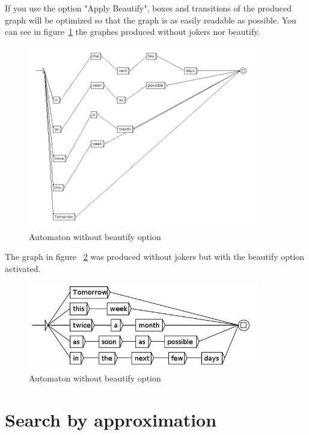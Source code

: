 If you use the option "Apply Beautify", boxes and transitions of the produced graph will be optimized so that the graph is as easily readable as possible. You can see in figure~\ref{fig8-5GRFnoBeautify} the graphes produced without jokers nor beautify.
\begin{figure}[h!]
	\begin{center}
		\includegraphics[width=10cm]{resources/img/fig8-5GRFnoBeautify.png}
		\caption{Automaton without beautify option\label{fig8-5GRFnoBeautify}}
	\end{center}
\end{figure}
\medskip
\newline
The graph in figure ~\ref{fig8-6GRFBeautify} was produced without jokers but with the beautify option activated.
\begin{figure}[h!]
	\begin{center}
		\includegraphics[width=10cm]{resources/img/fig8-6GRFBeautify.png}
		\caption{Automaton without beautify option\label{fig8-6GRFBeautify}}
	\end{center}
\end{figure}
\pagebreak
\section{Search by approximation} 
\label{approximation}

